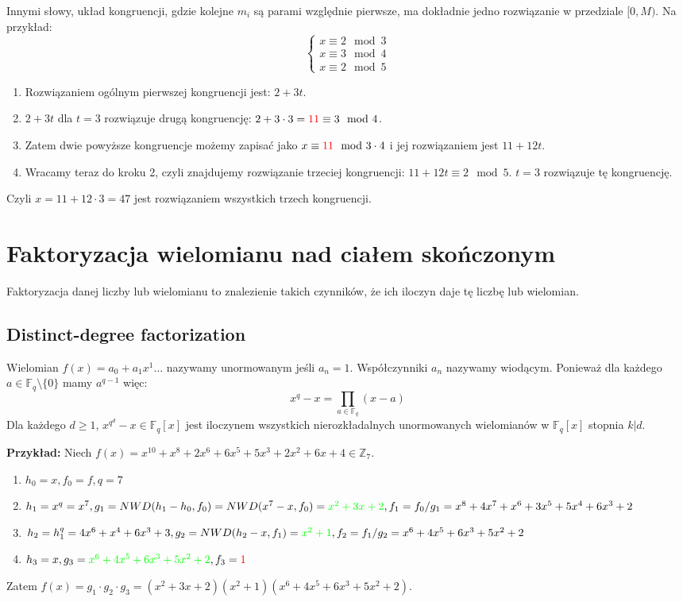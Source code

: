\documentclass{../notatki}
\begin{document}
Innymi słowy, układ kongruencji, gdzie kolejne $m_i$ są parami
względnie pierwsze, ma dokładnie jedno rozwiązanie w przedziale $[0, M)$.
Na przykład:
$$
\begin{cases}
  x \equiv 2 \mod 3\\
  x \equiv 3 \mod 4\\
  x \equiv 2 \mod 5
\end{cases}
$$
\begin{enumerate}
  \item Rozwiązaniem ogólnym pierwszej kongruencji jest: $2 + 3t$.
  \item $2 + 3t$ dla $t = 3$ rozwiązuje drugą kongruencję:
    $2 + 3 \cdot 3 =  \textcolor{red}{11} \equiv 3 \mod 4$.
  \item Zatem dwie powyższe kongruencje możemy zapisać jako $x \equiv
    \textcolor{red}{11} \mod 3 \cdot 4$ i jej rozwiązaniem jest $11 + 12t$.
  \item Wracamy teraz do kroku 2, czyli znajdujemy rozwiązanie
    trzeciej kongruencji: $11 + 12t \equiv 2 \mod 5$. $t = 3$ rozwiązuje tę
    kongruencję.
\end{enumerate}
Czyli $x = 11 + 12 \cdot 3 = 47$ jest rozwiązaniem wszystkich trzech
kongruencji.

\section{Faktoryzacja wielomianu nad ciałem skończonym}

Faktoryzacja danej liczby lub wielomianu to znalezienie takich
czynników, że ich iloczyn daje tę liczbę lub wielomian.

\subsection{Distinct-degree factorization}

Wielomian $f(x) = a_0 + a_1x^1 \dots$ nazywamy unormowanym jeśli $a_n = 1$.
Współczynniki $a_n$ nazywamy wiodącym. Ponieważ dla każdego $a \in
\mathbb{F}_q \setminus \{0\}$ mamy $a^{q-1}$ więc:
$$
x^q - x = \prod_{a \in \mathbb{F}_q} (x - a)
$$
Dla każdego $d \ge 1$, $x^{q^d} - x \in \mathbb{F}_q[x]$ jest
iloczynem wszystkich
nierozkładalnych unormowanych wielomianów w $\mathbb{F}_q[x]$ stopnia $k|d$.

\noindent
\textbf{Przykład:} Niech
$f(x) = x^{10} + x^8 + 2x^6 + 6x^5 + 5x^3 + 2x^2 + 6x + 4 \in \mathbb{Z}_7$.
\begin{enumerate}
  \item $h_0 = x, f_0 = f, q = 7$
  \item $h_1 = x^q = x^7, g_1 = NWD(h_1 - h_0, f_0) = NWD(x^7 - x,
    f_0) = \textcolor{green}{x^2 + 3x + 2}, f_1 = f_0 / g_1 = x^8 +
    4x^7 + x^6 + 3x^5 +
    5x^4 + 6x^3 + 2$
  \item $h_2 = h_1^q = 4x^6 + x^4 + 6x^3 + 3, g_2 = NWD(h_2 - x, f_1)
    = \textcolor{green}{x^2 + 1}, f_2 = f_1 / g_2 = x^6 + 4x^5 + 6x^3
    + 5x^2 + 2$
  \item $h_3 = x, g_3 = \textcolor{green}{x^6 + 4x^5 + 6x^3 + 5x^2 +
    2}, f_3 = \textcolor{red}{1}$
\end{enumerate}
Zatem $f(x) = g_1 \cdot g_2 \cdot g_3 = (x^2 + 3x + 2)(x^2 + 1)(x^6 +
4x^5 + 6x^3 + 5x^2 + 2)$.
\end{document}
